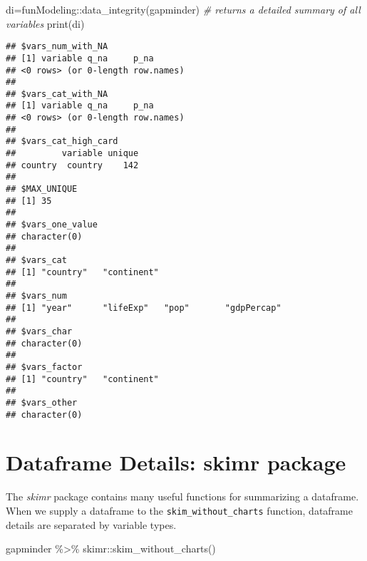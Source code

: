 \documentclass[
]{book}
\newenvironment{Shaded}{\begin{snugshade}}{\end{snugshade}}
\newcommand{\CommentTok}[1]{\textcolor[rgb]{0.56,0.35,0.01}{\textit{#1}}}
\newcommand{\FunctionTok}[1]{\textcolor[rgb]{0.00,0.00,0.00}{#1}}
\newcommand{\NormalTok}[1]{#1}
\newcommand{\OtherTok}[1]{\textcolor[rgb]{0.56,0.35,0.01}{#1}}
\newcommand{\SpecialCharTok}[1]{\textcolor[rgb]{0.00,0.00,0.00}{#1}}
\begin{document}
\begin{Shaded}
\begin{Highlighting}[]
\NormalTok{di}\OtherTok{=}\NormalTok{funModeling}\SpecialCharTok{::}\FunctionTok{data\_integrity}\NormalTok{(gapminder)}
\CommentTok{\# returns a detailed summary of all variables}
\FunctionTok{print}\NormalTok{(di)}
\end{Highlighting}
\end{Shaded}

\begin{verbatim}
## $vars_num_with_NA
## [1] variable q_na     p_na    
## <0 rows> (or 0-length row.names)
## 
## $vars_cat_with_NA
## [1] variable q_na     p_na    
## <0 rows> (or 0-length row.names)
## 
## $vars_cat_high_card
##         variable unique
## country  country    142
## 
## $MAX_UNIQUE
## [1] 35
## 
## $vars_one_value
## character(0)
## 
## $vars_cat
## [1] "country"   "continent"
## 
## $vars_num
## [1] "year"      "lifeExp"   "pop"       "gdpPercap"
## 
## $vars_char
## character(0)
## 
## $vars_factor
## [1] "country"   "continent"
## 
## $vars_other
## character(0)
\end{verbatim}

\hypertarget{dataframe-details-skimr-package}{%
\section{Dataframe Details: skimr package}\label{dataframe-details-skimr-package}}

The \emph{skimr} package contains many useful functions for summarizing a dataframe. When we supply a dataframe to the \texttt{skim\_without\_charts} function, dataframe details are separated by variable types.

\begin{Shaded}
\begin{Highlighting}[]
\NormalTok{gapminder }\SpecialCharTok{\%\textgreater{}\%} 
\NormalTok{  skimr}\SpecialCharTok{::}\FunctionTok{skim\_without\_charts}\NormalTok{() }
\end{Highlighting}
\end{Shaded}
\end{document}
